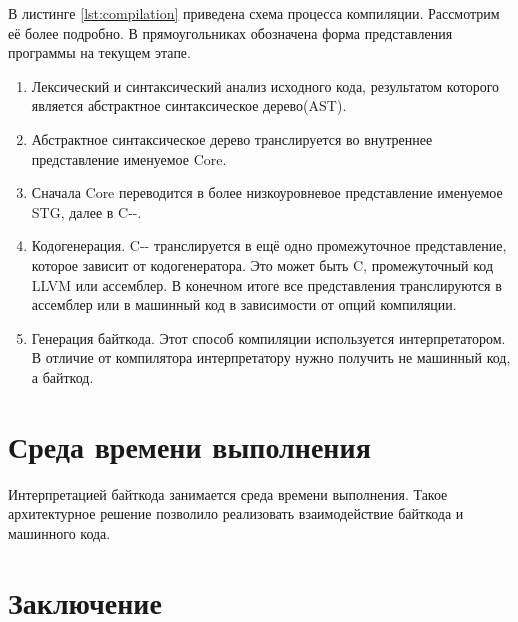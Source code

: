\documentclass[14pt]{extarticle}
\begin{document}
В листинге \ref{lst:compilation} приведена схема процесса компиляции.
Рассмотрим её более подробно. В прямоугольниках обозначена форма представления
программы на текущем этапе.

\begin{enumerate}[label={(\arabic*)}]

\item Лексический и синтаксический анализ исходного кода,
результатом которого является абстрактное синтаксическое дерево(AST). 

\item Абстрактное синтаксическое дерево транслируется во внутреннее представление
именуемое Core.

\item Сначала Core переводится в более низкоуровневое представление именуемое STG, далее
в C-{}-.

\item Кодогенерация. C-{}- транслируется в ещё одно промежуточное представление,
которое зависит от кодогенератора. Это может быть C, промежуточный код LLVM или
ассемблер. В конечном итоге все представления транслируются в ассемблер или в
машинный код в зависимости от опций компиляции.

\item Генерация байткода. Этот способ компиляции используется интерпретатором.
В отличие от компилятора интерпретатору нужно получить не машинный код, а байткод.

\end{enumerate}

\section{Среда времени выполнения}

Интерпретацией байткода занимается среда времени выполнения. Такое
архитектурное решение позволило реализовать взаимодействие байткода и машинного
кода.

\section{Заключение}
\end{document}
